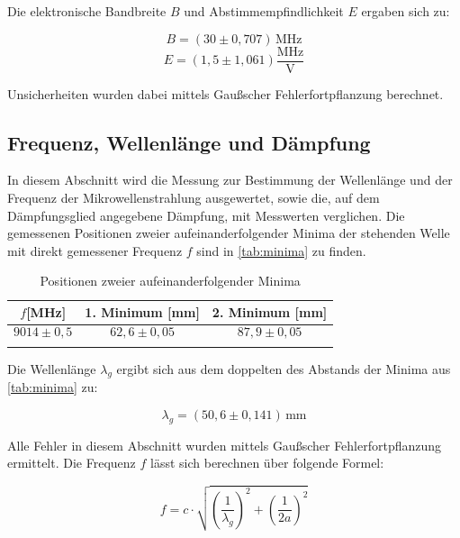 Die elektronische Bandbreite $B$ und Abstimmempfindlichkeit $E$ ergaben sich zu:

\begin{equation}
B = (30 \pm 0,707)\,\text{MHz}
\label{eq:bandbreite}
\end{equation}
\begin{equation}
E = (1,5 \pm 1,061) \frac{\text{MHz}}{\text{V}}
\label{eq:elbandbreite}
\end{equation}

Unsicherheiten wurden dabei mittels Gaußscher Fehlerfortpflanzung berechnet.

 







\subsection{Frequenz, Wellenlänge und Dämpfung}
\label{sec:fwd}


In diesem Abschnitt wird die Messung zur Bestimmung der Wellenlänge und der Frequenz der Mikrowellenstrahlung ausgewertet, sowie die, auf dem Dämpfungsglied angegebene Dämpfung, mit Messwerten verglichen.
Die gemessenen Positionen zweier aufeinanderfolgender Minima der stehenden Welle mit direkt gemessener Frequenz $f$ sind in \autoref{tab:minima} zu finden.


\begin{table}
\centering
\caption{Positionen zweier aufeinanderfolgender Minima}
\begin{tabular}{c c c}
\toprule
{$f$[MHz]} & {1. Minimum [mm]}&{2. Minimum [mm]}\\
\midrule
{$$9014\pm 0,5$$}&{$$62,6\pm 0,05$$}&{$$87,9\pm 0,05$$}\\
\bottomrule
\label{tab:minima}
\end{tabular}
\end{table}

Die Wellenlänge $\lambda_g$ ergibt sich aus dem doppelten des Abstands der Minima aus \autoref{tab:minima} zu:

\begin{equation}
\lambda_g = (50,6 \pm 0,141)\,\text{mm}
\label{eq:wellenlaenge}
\end{equation}

Alle Fehler in diesem Abschnitt wurden mittels Gaußscher Fehlerfortpflanzung ermittelt.
Die Frequenz $f$ lässt sich berechnen über folgende Formel:

\begin{equation}
f = c\cdot\sqrt{ (\frac{1}{\lambda_g})^2 + (\frac{1}{2a})^2 }
\label{eq:freq}
\end{equation}

